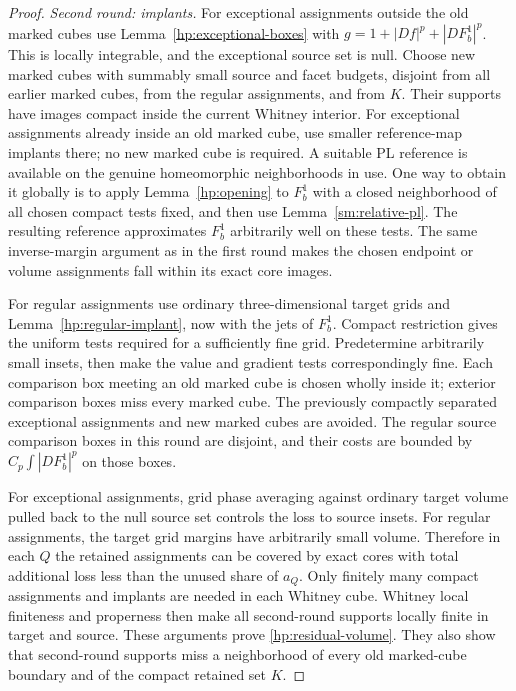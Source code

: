 \begin{proof}
\emph{Second round: implants.}
For exceptional assignments outside the old marked cubes use
Lemma~\ref{hp:exceptional-boxes} with
$g=1+|Df|^p+|DF_b^1|^p$.  This is locally integrable, and the
exceptional source set is null.  Choose new marked cubes with
summably small source and facet budgets, disjoint from all earlier
marked cubes, from the regular assignments, and from $K$.  Their
supports have images compact inside the current Whitney interior.
For exceptional assignments already inside an old marked cube,
use smaller reference-map implants there; no new marked cube is
required.  A suitable PL reference is available on the genuine
homeomorphic neighborhoods in use.  One way to obtain it globally
is to apply Lemma~\ref{hp:opening} to $F_b^1$ with a closed
neighborhood of all chosen compact tests fixed, and then use
Lemma~\ref{sm:relative-pl}.  The resulting reference approximates
$F_b^1$ arbitrarily well on these tests.  The same inverse-margin
argument as in the first round makes the chosen endpoint or volume
assignments fall within its exact core images.

For regular assignments use ordinary three-dimensional target grids
and Lemma~\ref{hp:regular-implant}, now with the jets of $F_b^1$.
Compact restriction gives the uniform tests required for a sufficiently
fine grid.  Predetermine arbitrarily small insets, then make the
value and gradient tests correspondingly fine.  Each comparison box
meeting an old marked cube is chosen wholly inside it; exterior
comparison boxes miss every marked cube.  The previously compactly
separated exceptional assignments and new marked cubes are avoided.
The regular source comparison boxes in this round are disjoint, and
their costs are bounded by $C_p\int|DF_b^1|^p$ on those boxes.

For exceptional assignments, grid phase averaging against ordinary
target volume pulled back to the null source set controls the loss
to source insets.  For regular assignments, the target grid margins
have arbitrarily small volume.  Therefore in each $Q$ the retained
assignments can be covered by exact cores with total additional
loss less than the unused share of $a_Q$.  Only finitely many compact
assignments and implants are needed in each Whitney cube.  Whitney
local finiteness and properness then make all second-round supports
locally finite in target and source.  These arguments prove
\eqref{hp:residual-volume}.  They also show that second-round
supports miss a neighborhood of every old marked-cube boundary and
of the compact retained set $K$.


\end{proof}

